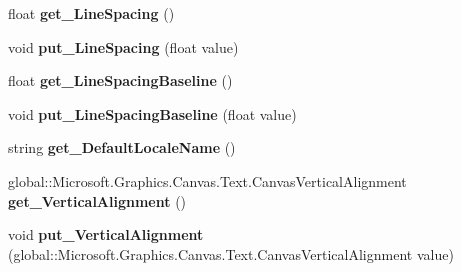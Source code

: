 \begin{DoxyCompactItemize}
float {\bfseries get\+\_\+\+Line\+Spacing} ()
\item 
\mbox{\label{interface_microsoft_1_1_graphics_1_1_canvas_1_1_text_1_1_i_canvas_text_layout_a10d3cad771046bf1024366e3b21355bf}} 
void {\bfseries put\+\_\+\+Line\+Spacing} (float value)
\item 
\mbox{\label{interface_microsoft_1_1_graphics_1_1_canvas_1_1_text_1_1_i_canvas_text_layout_a5c4a020aeb7f99894e140c083d0b6730}} 
float {\bfseries get\+\_\+\+Line\+Spacing\+Baseline} ()
\item 
\mbox{\label{interface_microsoft_1_1_graphics_1_1_canvas_1_1_text_1_1_i_canvas_text_layout_a3f87f36c09292a19ebe6e72f306161d7}} 
void {\bfseries put\+\_\+\+Line\+Spacing\+Baseline} (float value)
\item 
\mbox{\label{interface_microsoft_1_1_graphics_1_1_canvas_1_1_text_1_1_i_canvas_text_layout_af248dfd0ffc3343fe06b678a4187ee4f}} 
string {\bfseries get\+\_\+\+Default\+Locale\+Name} ()
\item 
\mbox{\label{interface_microsoft_1_1_graphics_1_1_canvas_1_1_text_1_1_i_canvas_text_layout_ab4a563e714253a63ce04baf03dcc74d1}} 
global\+::\+Microsoft.\+Graphics.\+Canvas.\+Text.\+Canvas\+Vertical\+Alignment {\bfseries get\+\_\+\+Vertical\+Alignment} ()
\item 
\mbox{\label{interface_microsoft_1_1_graphics_1_1_canvas_1_1_text_1_1_i_canvas_text_layout_a739a2321aadcdbc5778eb75fff7a82d6}} 
void {\bfseries put\+\_\+\+Vertical\+Alignment} (global\+::\+Microsoft.\+Graphics.\+Canvas.\+Text.\+Canvas\+Vertical\+Alignment value)
\item 
\mbox{\label{interface_microsoft_1_1_graphics_1_1_canvas_1_1_text_1_1_i_canvas_text_layout_a0eca2347bb72344130499308b22b5c75}} 

\end{DoxyCompactItemize}

